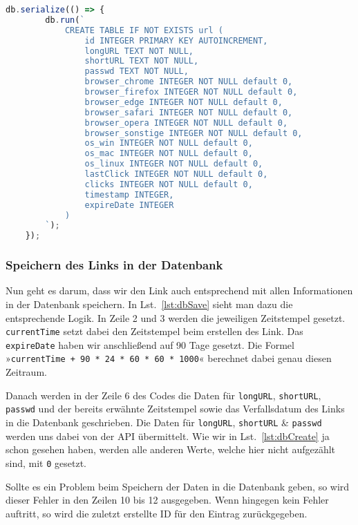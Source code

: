 \documentclass[a4paper,11pt,DIV=12,overfullrule=on]{scrreprt}%
\begin{document}
\begin{lstlisting}[language=JavaScript,
    caption={Die Statistiken werden initial auf 0 gesetzt, der Timestamp ist der Datumswert der Erstellung des Eintrags},
    label={lst:dbCreate},
    float=h,
    gobble=4
]
    db.serialize(() => {
        db.run(`
            CREATE TABLE IF NOT EXISTS url (
                id INTEGER PRIMARY KEY AUTOINCREMENT,
                longURL TEXT NOT NULL,
                shortURL TEXT NOT NULL,
                passwd TEXT NOT NULL,
                browser_chrome INTEGER NOT NULL default 0,
                browser_firefox INTEGER NOT NULL default 0,
                browser_edge INTEGER NOT NULL default 0,
                browser_safari INTEGER NOT NULL default 0,
                browser_opera INTEGER NOT NULL default 0,
                browser_sonstige INTEGER NOT NULL default 0,
                os_win INTEGER NOT NULL default 0,
                os_mac INTEGER NOT NULL default 0,
                os_linux INTEGER NOT NULL default 0,
                lastClick INTEGER NOT NULL default 0,
                clicks INTEGER NOT NULL default 0,
                timestamp INTEGER,
                expireDate INTEGER
            )
        `);
    });
\end{lstlisting}

\subsubsection{Speichern des Links in der Datenbank}
Nun geht es darum, dass wir den Link auch entsprechend mit allen Informationen in der Datenbank speichern. In Lst.~\ref{lst:dbSave} sieht man dazu die entsprechende Logik. 
In Zeile 2 und 3 werden die jeweiligen Zeitstempel gesetzt. \texttt{currentTime} setzt dabei den Zeitstempel beim erstellen des Link. Das \texttt{expireDate} haben wir anschließend auf 90 Tage gesetzt. Die Formel »\texttt{currentTime + 90 * 24 * 60 * 60 * 1000}« berechnet dabei genau diesen Zeitraum.

Danach werden in der Zeile 6 des Codes die Daten für \texttt{longURL}, \texttt{shortURL}, \texttt{passwd} und der bereits erwähnte Zeitstempel sowie das Verfallsdatum des Links in die Datenbank geschrieben. Die Daten für \texttt{longURL}, \texttt{shortURL} \& \texttt{passwd} werden uns dabei von der API übermittelt.
Wie wir in Lst.~\ref{lst:dbCreate} ja schon gesehen haben, werden alle anderen Werte, welche hier nicht aufgezählt sind, mit \texttt{0} gesetzt. 

Sollte es ein Problem beim Speichern der Daten in die Datenbank geben, so wird dieser Fehler in den Zeilen 10 bis 12 ausgegeben. Wenn hingegen kein Fehler auftritt, so wird die zuletzt erstellte ID für den Eintrag zurückgegeben. 
\end{document}
